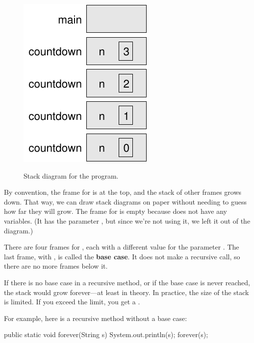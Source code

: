\begin{figure}[!ht]
\begin{center}
\includegraphics[alt={Stack diagram showing the call stack for countdown method with four frames, each containing parameter n with values 3, 2, 1, and 0 as the base case}]{figs/stack2.pdf}
\caption{Stack diagram for the  program.}
\label{fig.stack2}
\end{center}
\end{figure}

By convention, the frame for  is at the top, and the stack of other frames grows down.
That way, we can draw stack diagrams on paper without needing to guess how far they will grow.
The frame for  is empty because  does not have any variables.
(It has the parameter , but since we're not using it, we left it out of the diagram.)


There are four frames for , each with a different value for the parameter .
The last frame, with , is called the {\bf base case}.
It does not make a recursive call, so there are no more frames below it.


If there is no base case in a recursive method, or if the base case is never reached, the stack would grow forever---at least in theory.
In practice, the size of the stack is limited.
If you exceed the limit, you get a .

For example, here is a recursive method without a base case:

\begin{code}
public static void forever(String s) {
    System.out.println(s);
    forever(s);
}
\end{code}


